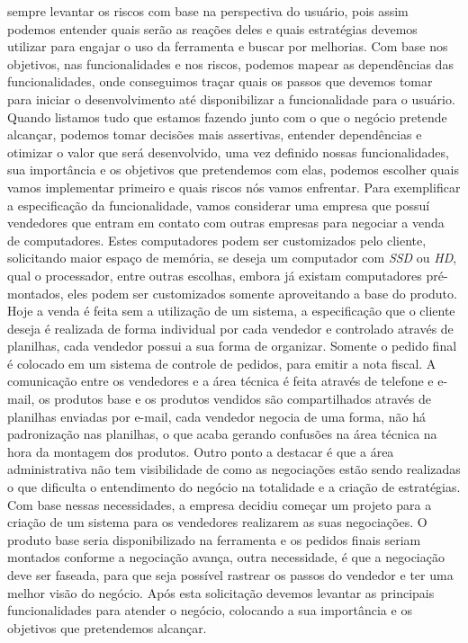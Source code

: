       sempre levantar os riscos com base na perspectiva do usuário, pois assim
      podemos entender quais serão as reações deles e quais estratégias devemos
      utilizar para engajar o uso da ferramenta e buscar por melhorias. Com base
      nos objetivos, nas funcionalidades e nos riscos, podemos mapear as dependências
      das funcionalidades, onde conseguimos traçar quais os passos que devemos tomar
      para iniciar o desenvolvimento até disponibilizar a funcionalidade para o
      usuário. \newline
      Quando listamos tudo que estamos fazendo junto com o que o negócio pretende
      alcançar, podemos tomar decisões mais assertivas, entender dependências e
      otimizar o valor que será desenvolvido, uma vez definido nossas funcionalidades,
      sua importância e os objetivos que pretendemos com elas, podemos escolher
      quais vamos implementar primeiro e quais riscos nós vamos enfrentar. Para
      exemplificar a especificação da funcionalidade, vamos considerar uma empresa
      que possuí vendedores que entram em contato com outras empresas para negociar
      a venda de computadores. Estes computadores podem ser customizados pelo cliente,
      solicitando maior espaço de memória, se deseja um computador com \textit{SSD}
      ou \textit{HD}, qual o processador, entre outras escolhas, embora já existam
      computadores pré-montados, eles podem ser customizados somente aproveitando
      a base do produto. \newline
      Hoje a venda é feita sem a utilização de um sistema, a especificação que o
      cliente deseja é realizada de forma individual por cada vendedor e controlado
      através de planilhas, cada vendedor possui a sua forma de organizar. Somente
      o pedido final é colocado em um sistema de controle de pedidos, para emitir a
      nota fiscal. A comunicação entre os vendedores e a área técnica é feita através
      de telefone e e-mail, os produtos base e os produtos vendidos são compartilhados
      através de planilhas enviadas por e-mail, cada vendedor negocia de uma forma,
      não há padronização nas planilhas, o que acaba gerando confusões na área
      técnica na hora da montagem dos produtos. Outro ponto a destacar é que a
      área administrativa não tem visibilidade de como as negociações estão sendo
      realizadas o que dificulta o entendimento do negócio na totalidade e a criação
      de estratégias. \newline
      Com base nessas necessidades, a empresa decidiu começar um projeto para a
      criação de um sistema para os vendedores realizarem as suas negociações.
      O produto base seria disponibilizado na ferramenta e os pedidos finais
      seriam montados conforme a negociação avança, outra necessidade, é que a
      negociação deve ser faseada, para que seja possível rastrear os passos do
      vendedor e ter uma melhor visão do negócio. Após esta solicitação devemos
      levantar as principais funcionalidades para atender o negócio, colocando
      a sua importância e os objetivos que pretendemos alcançar. \newline

